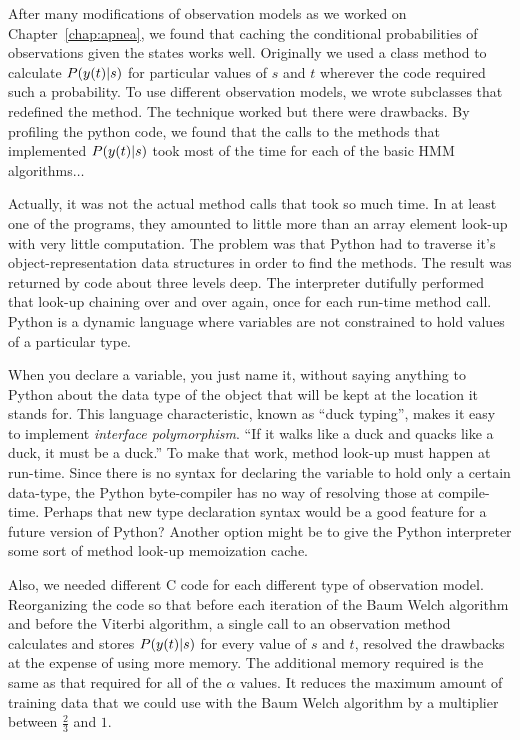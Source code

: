 After many modifications of observation models as we worked on
Chapter~\ref{chap:apnea}, we found that caching the conditional
probabilities of observations given the states works well.  Originally
we used a class method to calculate $P({y}{(t)}|s)$ for particular
values of $s$ and $t$ wherever the code required such a probability.
To use different observation models, we wrote subclasses that
redefined the method.  The technique worked but there were drawbacks.
By profiling the python code, we found that the calls to the methods
that implemented $P({y}{(t)}|s)$ took most of the time for each of
the basic HMM algorithms$\ldots$

Actually, it was not the actual method calls that took so much time.
In at least one of the programs, they amounted to little more than an
array element look-up with very little computation.  The problem was
that Python had to traverse it's object-representation data structures
in order to find the methods.  The result was returned by code about
three levels deep.  The interpreter dutifully performed that look-up
chaining over and over again, once for each run-time method call.
Python is a dynamic language where variables are not constrained to
hold values of a particular type.

When you declare a variable, you just name it, without saying anything
to Python about the data type of the object that will be kept at the
location it stands for.  This language characteristic, known as ``duck
typing'', makes it easy to implement \emph{interface polymorphism}.
``If it walks like a duck and quacks like a duck, it must be a duck.''
To make that work, method look-up must happen at run-time.  Since
there is no syntax for declaring the variable to hold only a certain
data-type, the Python byte-compiler has no way of resolving those at
compile-time.  Perhaps that new type declaration syntax would be a
good feature for a future version of Python?  Another option might be
to give the Python interpreter some sort of method look-up memoization
cache.

Also, we needed different C code for each different type of
observation model.  Reorganizing the code so that before each
iteration of the Baum Welch algorithm and before the Viterbi
algorithm, a single call to an observation method calculates and
stores $P({y}{(t)}|s)$ for every value of $s$ and $t$, resolved the
drawbacks at the expense of using more memory.  The additional memory
required is the same as that required for all of the $\alpha$ values.
It reduces the maximum amount of training data that we could use with
the Baum Welch algorithm by a multiplier between $\frac{2}{3}$ and
$1$.

\begin{CVSID}
\end{CVSID}


